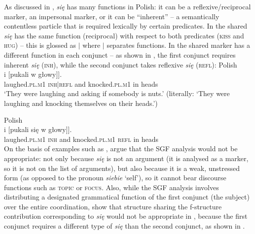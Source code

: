 \documentclass[output=paper]{../langscibook}
\begin{document}
As discussed in \citet{PatejukPrzepiorkowski2015}, \emph{się} has many
functions in Polish: it can be a reflexive/reciprocal marker, an
impersonal marker, or it can be ``inherent'' – a semantically
contentless particle that is required lexically by certain
predicates.
%
In  the shared
\emph{się} has the same function (reciprocal) with respect to both
predicates (\textsc{kiss} and \textsc{hug}) – this is glossed as
{\RECP}$\vert${\RECP} where $\vert$ separates functions.
%
In  the shared marker has a different
function in each conjunct – as shown in ,
the first conjunct requires inherent \emph{się} (\textsc{inh}), while
the second conjunct takes reflexive \emph{się} (\textsc{refl}):
\ea\label{ex:cstr:pat:prz:15:34}
  Polish\\\gll
    [[Śmiali się] i [pukali w głowy]]. \\
    \phtm{[[}laughed.\textsc{pl.m1} \textsc{inh$\vert$refl} and \phtm{[}knocked.\textsc{pl.m1} in heads\\
\glt`They were laughing and asking if somebody is nuts.' (literally: `They were laughing and knocking themselves on their heads.')%
  \item\label{ex:cstr:pat:prz:15:35}
  Polish\\\gll
    [[Śmiali się] i [pukali się w głowy]]. \\
    \phtm{[[}laughed.\textsc{pl.m1} \textsc{inh} and \phtm{[}knocked.\textsc{pl.m1} \textsc{refl} in heads\\
\z
On the basis of examples such as , \citet{PatejukPrzepiorkowski2015} argue that the
SGF analysis would not be appropriate: not only because
\emph{się} is not an argument (it is analysed as a marker, so
it is not on the list of arguments), but also
because it is a weak, unstressed form (as opposed to the pronoun
\emph{siebie} `self'), so it cannot bear discourse functions such as \textsc{topic} or
\textsc{focus}. Also, while the SGF analysis involves distributing a designated
grammatical function of the first conjunct (the subject) over the
entire coordination, \citet{PatejukPrzepiorkowski2015} show that structure sharing
the f-structure contribution corresponding to \emph{się} would not be
appropriate in , because the first conjunct
requires a different type of \emph{się} than the second conjunct, as
shown in .
\end{document}
